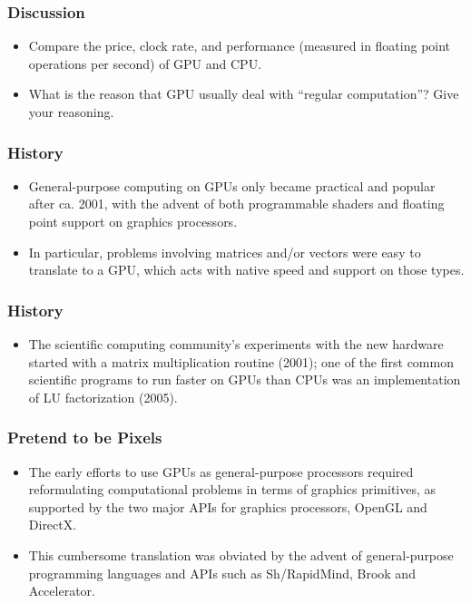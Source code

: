 \documentclass{beamer}
\begin{document}
\begin{frame}
  \frametitle{Discussion}
  \begin{itemize}
  \item Compare the price, clock rate, and performance (measured in
    floating point operations per second) of GPU and CPU.
  \item What is the reason that GPU usually deal with ``regular
    computation''?  Give your reasoning.
  \end{itemize}
\end{frame}

\begin{frame}
  \frametitle{History}
  \begin{itemize}
  \item General-purpose computing on GPUs only became practical and
    popular after ca. 2001, with the advent of both programmable
    shaders and floating point support on graphics processors.
  \item In particular, problems involving matrices and/or vectors were
    easy to translate to a GPU, which acts with native speed and
    support on those types.
  \end{itemize}
\end{frame}

\begin{frame}
  \frametitle{History}
  \begin{itemize}
  \item The scientific computing community's experiments with the new
    hardware started with a matrix multiplication routine (2001); one
    of the first common scientific programs to run faster on GPUs than
    CPUs was an implementation of LU factorization (2005).
  \end{itemize}
\end{frame}

\begin{frame}
  \frametitle{Pretend to be Pixels}
  \begin{itemize}
  \item The early efforts to use GPUs as general-purpose processors
    required reformulating computational problems in terms of graphics
    primitives, as supported by the two major APIs for graphics
    processors, OpenGL and DirectX. 
  \item This cumbersome translation was obviated by the advent of
    general-purpose programming languages and APIs such as Sh/RapidMind,
    Brook and Accelerator.
  \end{itemize}
\end{frame}
\end{document}
